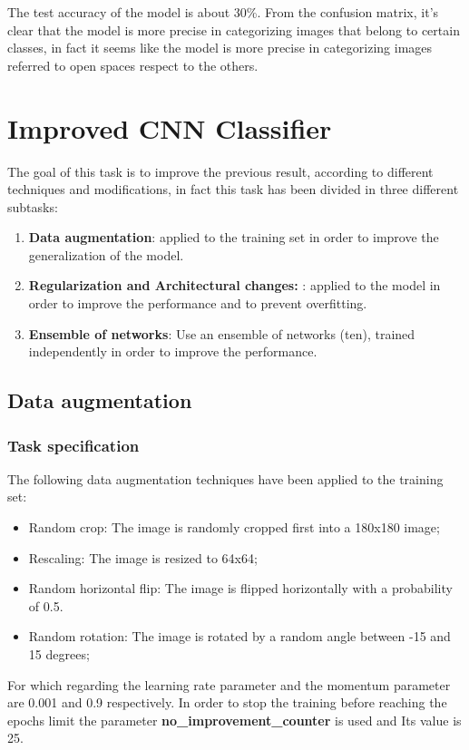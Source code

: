 \documentclass[12pt, a4paper, italian]{scrartcl}
\begin{document}
The test accuracy of the model is about 30\%.
From the confusion matrix, it's clear that the model is more precise in categorizing images that belong to certain classes, in fact it seems like the model is more precise in categorizing images referred to open spaces respect to the others. 
  
  
    \newpage
    \section{Improved CNN Classifier}
The goal of this task is to improve the previous result, according to different techniques and modifications, in fact this task has been divided in three different subtasks:
\begin{enumerate}
	\item \textbf{Data augmentation}: applied to the training set in order to improve
the generalization of the model.
	\item \textbf{Regularization and Architectural changes: }: applied to the model in order to improve the performance and to prevent overfitting.
	\item \textbf{Ensemble of networks}: Use an ensemble of networks (ten), trained independently in order to improve the performance.
\end{enumerate}

     
     \subsection{Data augmentation}
      \subsubsection{Task specification}
The following data augmentation techniques have been applied to the training set:   
    \begin{itemize}
	\item Random crop: The image is randomly cropped first into a 180x180 image;
	\item Rescaling: The image is resized to 64x64;
	\item Random horizontal flip: The image is flipped horizontally with a probability of 0.5.
	\item Random rotation: The image is rotated by a random angle between -15 and 15 degrees;
\end{itemize} 
For which regarding the learning rate parameter and the momentum parameter are 0.001 and 0.9 respectively.
In order to stop the training before reaching the epochs limit the parameter \textbf{no\_improvement\_counter} is used and Its value is 25.
\end{document}
